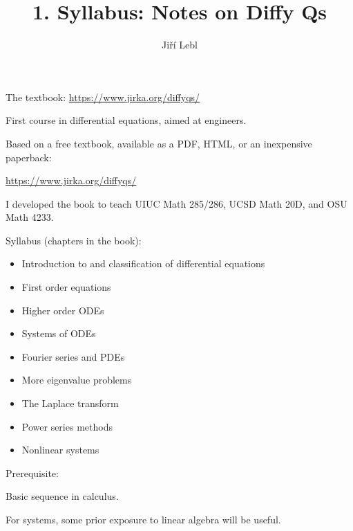 \documentclass[10pt,aspectratio=169]{beamer}
\author{Ji\v{r}\'i Lebl}
\institute[OSU]{%
Oklahoma State University%
}
\title{1. Syllabus: Notes on Diffy Qs}
\date{}
\begin{document}
\begin{frame}
\titlepage


\begin{center}
The textbook: \url{https://www.jirka.org/diffyqs/}
\end{center}
\end{frame}

\begin{frame}
First course in differential equations, aimed at engineers.

\pause
\medskip

Based on a free textbook, available as a PDF, HTML, or an inexpensive
paperback:

\url{https://www.jirka.org/diffyqs/}

\pause
\medskip

I developed the book
to teach UIUC Math 285/286, UCSD Math 20D, and OSU Math 4233.

\end{frame}

\begin{frame}
Syllabus (chapters in the book):

\begin{itemize}
\item\pause
Introduction to and classification of differential equations
\item\pause
First order equations
\item\pause
Higher order ODEs
\item\pause
Systems of ODEs
\item\pause
Fourier series and PDEs
\item\pause
More eigenvalue problems
\item\pause
The Laplace transform
\item\pause
Power series methods
\item\pause
Nonlinear systems
\end{itemize}
\end{frame}

\begin{frame}
Prerequisite:

\medskip

Basic sequence in calculus.

\medskip

For systems, some prior exposure to linear algebra will be useful.

\end{frame}
\end{document}
